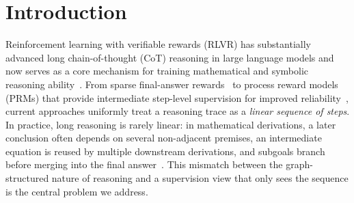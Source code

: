 \section{Introduction}
\label{sec:introduction}

Reinforcement learning with verifiable rewards (RLVR) has substantially advanced long chain-of-thought (CoT) reasoning in large language models and now serves as a core mechanism for training mathematical and symbolic reasoning ability~\citep{wei2022chain,kojima2022large,deepseekr1,yeo2025demystify,shao2024deepseekmath}. From sparse final-answer rewards~\citep{cobbe2021gsm8k,deepseekr1} to process reward models (PRMs) that provide intermediate step-level supervision for improved reliability~\citep{lightman2023lets,wang2024math,uesato2022solving}, current approaches uniformly treat a reasoning trace as a \emph{linear sequence of steps}. In practice, long reasoning is rarely linear: in mathematical derivations, a later conclusion often depends on several non-adjacent premises, an intermediate equation is reused by multiple downstream derivations, and subgoals branch before merging into the final answer~\citep{besta2024graph}. This mismatch between the graph-structured nature of reasoning and a supervision view that only sees the sequence is the central problem we address.

